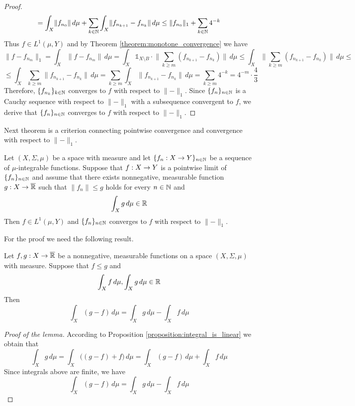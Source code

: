 \begin{proof}
$$= \int_X\lVert f_{n_0}\rVert \,d\mu + \sum_{k\in {\mathbb N}}\int_X \lVert f_{n_{k+1}}-f_{n_k}\rVert \,d\mu \leq \lVert f_{n_0}\rVert_1 + \sum_{k\in {\mathbb N}}4^{-k} $$
Thus $f\in L^1(\mu,Y)$ and by Theorem \ref{theorem:monotone_convergence} we have
$$\lVert f - f_{n_m}\rVert_1 = \int_X\lVert f - f_{n_m}\rVert \,d\mu = \int_X\mathbb{1}_{X\setminus B}\cdot \big\lVert \sum_{k\geq m}\left(f_{n_{k+1}} - f_{n_k}\right)\big\rVert \,d\mu \leq  \int_X \big\lVert \sum_{k\geq m}\left(f_{n_{k+1}} - f_{n_k}\right)\big\rVert \,d\mu \leq $$
$$\leq \int_X\sum_{k\geq m}\lVert f_{n_{k+1}} - f_{n_k}\rVert \,d\mu =\sum_{k\geq m}\int_X\lVert f_{n_{k+1}} - f_{n_k}\rVert \,d\mu = \sum_{k\geq m}4^{-k} = 4^{-m}\cdot \frac{4}{3} $$
Therefore, $\{f_{n_k}\}_{k\in {\mathbb N}}$ converges to $f$ with respect to $\lVert -\rVert_1$. Since $\{f_n\}_{n\in {\mathbb N}}$ is a Cauchy sequence with respect to $\lVert-\rVert_1$ with a subsequence convergent to $f$, we derive that $\{f_n\}_{n\in {\mathbb N}}$ converges to $f$ with respect to $\lVert -\rVert_1$.
\end{proof}
\noindent
Next theorem is a criterion connecting pointwise convergence and convergence with respect to $\lVert -\rVert_1$.

\begin{theorem}\label{theorem:dominated_convergence}
Let $(X,\Sigma,\mu)$ be a space with measure and let $\{f_n:X\rightarrow Y\}_{n\in {\mathbb N}}$ be a sequence of $\mu$-integrable functions. Suppose that $f:X\rightarrow Y$ is a pointwise limit of $\{f_n\}_{n\in {\mathbb N}}$ and assume that there exists nonnegative, measurable function $g:X\rightarrow \overline{{\mathbb R}}$ such that $\lVert f_n\rVert \leq g$ holds for every $n\in {\mathbb N}$ and
$$\int_X g\,d\mu\in {\mathbb R}$$
Then $f\in L^1(\mu,Y)$ and $\{f_n\}_{n\in {\mathbb N}}$ converges to $f$ with respect to $\lVert -\rVert_1$.
\end{theorem}
For the proof we need the following result.

\begin{lemma}\label{lemma:difference_of_integrals}
Let $f, g:X\rightarrow \overline{{\mathbb R}}$ be a nonnegative, measurable functions on a space $(X,\Sigma,\mu)$ with measure. Suppose that $f \leq g$ and
$$\int_Xf\,d\mu, \int_Xg\,d\mu\in {\mathbb R}$$
Then
$$\int_X(g-f)\,d\mu = \int_Xg\,d\mu - \int_Xf\,d\mu$$
\end{lemma}
\begin{proof}[Proof of the lemma]
According to Proposition \ref{proposition:integral_is_linear} we obtain that
$$\int_Xg\,d\mu = \int_X\big((g-f) + f\big)\,d\mu = \int_X(g-f)\,d\mu + \int_Xf\,d\mu$$
Since integrals above are finite, we have
$$\int_X(g-f)\,d\mu = \int_Xg\,d\mu - \int_Xf\,d\mu$$
\end{proof}

